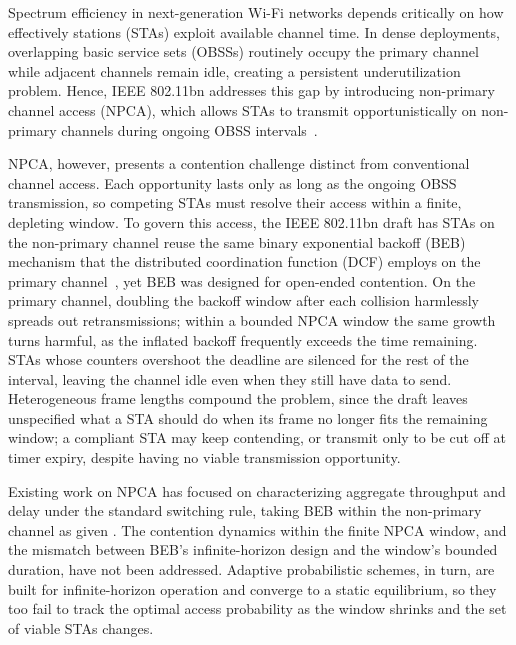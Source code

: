 \documentclass[conference]{IEEEtran}
\begin{document}
Spectrum efficiency in next-generation Wi-Fi networks depends critically on how effectively stations (STAs) exploit available channel time. In dense deployments, overlapping basic service sets (OBSSs) routinely occupy the primary channel while adjacent channels remain idle, creating a persistent underutilization problem. Hence, IEEE 802.11bn addresses this gap by introducing non-primary channel access (NPCA), which allows STAs to transmit opportunistically on non-primary channels during ongoing OBSS intervals~\cite{ieee80211bn,wei2024non}.

NPCA, however, presents a contention challenge distinct from conventional channel access. Each opportunity lasts only as long as the ongoing OBSS transmission, so competing STAs must resolve their access within a finite, depleting window. To govern this access, the IEEE 802.11bn draft has STAs on the non-primary channel reuse the same binary exponential backoff (BEB) mechanism that the distributed coordination function (DCF) employs on the primary channel~\cite{ieee80211bn}, yet BEB was designed for open-ended contention. On the primary channel, doubling the backoff window after each collision harmlessly spreads out retransmissions; within a bounded NPCA window the same growth turns harmful, as the inflated backoff frequently exceeds the time remaining. STAs whose counters overshoot the deadline are silenced for the rest of the interval, leaving the channel idle even when they still have data to send. Heterogeneous frame lengths compound the problem, since the draft leaves unspecified what a STA should do when its frame no longer fits the remaining window; a compliant STA may keep contending, or transmit only to be cut off at timer expiry, despite having no viable transmission opportunity.


Existing work on NPCA has focused on characterizing aggregate throughput and delay under the standard switching rule, taking BEB within the non-primary channel as given \cite{wei2024non,bellalta2025performance,wei2024optimized}. The contention dynamics within the finite NPCA window, and the mismatch between BEB's infinite-horizon design and the window's bounded duration, have not been addressed. Adaptive probabilistic schemes, in turn, are built for infinite-horizon operation and converge to a static equilibrium, so they too fail to track the optimal access probability as the window shrinks and the set of viable STAs changes.
\end{document}
